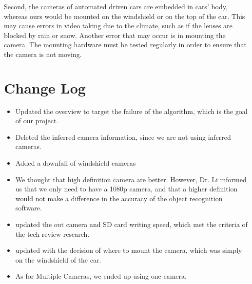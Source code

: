 \documentclass[10pt,draftclsnofoot,onecolumn,journal,compsoc]{IEEEtran}
\begin{document}
Second, the cameras of automated driven cars are embedded in cars’ body, whereas ours would be mounted on the windshield or on the top of the car. This may cause errors in video taking due to the climate, such as if the lenses are blocked by rain or snow. Another error that may occur is in mounting the camera. The mounting hardware must be tested regularly in order to ensure that the camera is not moving.

\section{Change Log}
    \begin{itemize}
        \item Updated the overview to target the failure of the algorithm, which is the goal of our project.
        \item Deleted the inferred camera information, since we are not using inferred cameras.
        \item Added a downfall of windshield cameras
        \item We thought that high definition camera are better. However, Dr. Li informed us that we only need to have a 1080p camera, and that a higher definition would not make a difference in the accuracy of the object recognition software.
        \item updated the out camera and SD card writing speed, which met the criteria of the tech review research.
        \item updated with the decision of where to mount the camera, which was simply on the windshield of the car.
        \item As for Multiple Cameras, we ended up using one camera.
    \end{itemize}
\end{document}
